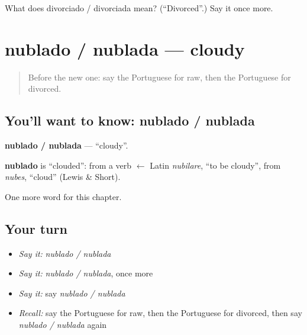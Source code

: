 \begin{tcolorbox}[breakable,colback=teal!4,colframe=teal!35!black,title={Before you move on}]
What does divorciado / divorciada mean? (\textquotedblleft{}Divorced\textquotedblright{}.) Say it once more.
\end{tcolorbox}
\section[nublado / nublada]{nublado / nublada — cloudy}

\label{lesson:PT-C217-nublado-nublada}



\begin{quote}
Before the new one: say the Portuguese for raw, then the Portuguese for divorced.
\end{quote}

\subsection*{You'll want to know: nublado / nublada}
\textbf{nublado / nublada} — \textquotedblleft{}cloudy\textquotedblright{}.

\begin{cousinweb}
\textbf{nublado} is \textquotedblleft{}clouded\textquotedblright{}: from a verb $\leftarrow$ Latin \emph{nubilare}, \textquotedblleft{}to be cloudy\textquotedblright{}, from \emph{nubes}, \textquotedblleft{}cloud\textquotedblright{} (Lewis \& Short).
\end{cousinweb}

\begin{grammarlens}[title={What you've built}]
One more word for this chapter.
\end{grammarlens}

\subsection*{Your turn}
\begin{itemize}
\raggedright
  \item \emph{Say it:} \emph{nublado / nublada}
  \item \emph{Say it:} \emph{nublado / nublada}, once more
  \item \emph{Say it:} say \emph{nublado / nublada}
  \item \emph{Recall:} say the Portuguese for raw, then the Portuguese for divorced, then say \emph{nublado / nublada} again
\end{itemize}

